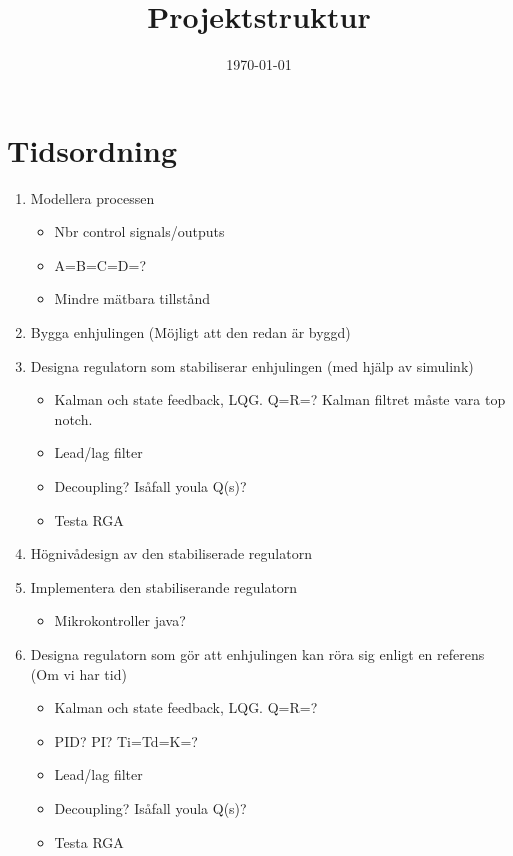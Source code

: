 \documentclass[a4paper]{article}
\title{Projektstruktur}
\author{}
\date{\today}
\begin{document}
\maketitle



\section{Tidsordning}

\begin{enumerate}

\item Modellera processen
\begin{itemize}
\item Nbr control signals/outputs
\item A=B=C=D=?
\item Mindre mätbara tillstånd
\end{itemize}

\item Bygga enhjulingen (Möjligt att den redan är byggd)

\item Designa regulatorn som stabiliserar enhjulingen (med hjälp av simulink)
\begin{itemize}
\item Kalman och state feedback, LQG. Q=R=? Kalman filtret måste vara top notch.
\item Lead/lag filter
\item Decoupling? Isåfall youla Q(s)?
\item Testa RGA
\end{itemize}

\item Högnivådesign av den stabiliserade regulatorn

\item Implementera den stabiliserande regulatorn
\begin{itemize}
\item Mikrokontroller java?
\end{itemize}


\item Designa regulatorn som gör att enhjulingen kan röra sig enligt en referens (Om vi har tid)
\begin{itemize}
\item Kalman och state feedback, LQG. Q=R=?
\item PID? PI? Ti=Td=K=?
\item Lead/lag filter
\item Decoupling? Isåfall youla Q(s)?
\item Testa RGA
\end{itemize}


\end{enumerate}
\end{document}
